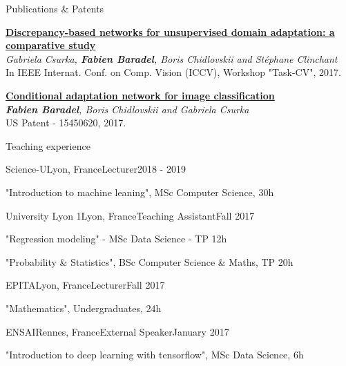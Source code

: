 \documentclass{resume} %
\begin{document}
\begin{rSection}{Publications \& Patents}
        \item \href{http://openaccess.thecvf.com/content_ICCV_2017_workshops/w38/html/Csurka_Discrepancy-Based_Networks_for_ICCV_2017_paper.html}{\textbf{Discrepancy-based networks for unsupervised domain adaptation: a comparative study}} \\ \textit{Gabriela Csurka, \textbf{Fabien Baradel}, Boris Chidlovskii and Stéphane Clinchant} \\ In IEEE Internat. Conf. on Comp. Vision (ICCV), Workshop "Task-CV", 2017. \vspace{0.3em}
	\item \href{https://patentscope.wipo.int/search/en/detail.jsf;jsessionid=3A48BFD50DA5C2E7D2DBD17E0B5F8D40.wapp2nB?docId=US225503247&recNum=21861&office=&queryString=&prevFilter=&sortOption=Pub+Date+Desc&maxRec=70863381}{\textbf{Conditional adaptation network for image classification}} \\ \textit{\textbf{Fabien Baradel}, Boris Chidlovskii and Gabriela Csurka} \\ US Patent - 15450620, 2017. \vspace{0.3em}
\end{rSection}

\begin{rSection}{Teaching experience}
        \begin{rSubsection}{Science-U}{Lyon, France}{Lecturer}{2018 - 2019}
               \item "Introduction to machine leaning", MSc Computer Science, 30h
       \end{rSubsection}
       \begin{rSubsection}{University Lyon 1}{Lyon, France}{Teaching Assistant}{Fall 2017}
               \item "Regression modeling" - MSc Data Science - TP 12h
               \item "Probability \& Statistics", BSc Computer Science \& Maths, TP 20h
       \end{rSubsection}
       \begin{rSubsection}{EPITA}{Lyon, France}{Lecturer}{Fall 2017}
               \item "Mathematics", Undergraduates, 24h
       \end{rSubsection}
       \begin{rSubsection}{ENSAI}{Rennes, France}{External Speaker}{January 2017}
               \item "Introduction to deep learning with tensorflow", MSc Data Science, 6h
       \end{rSubsection}
\end{rSection}
\end{document}
